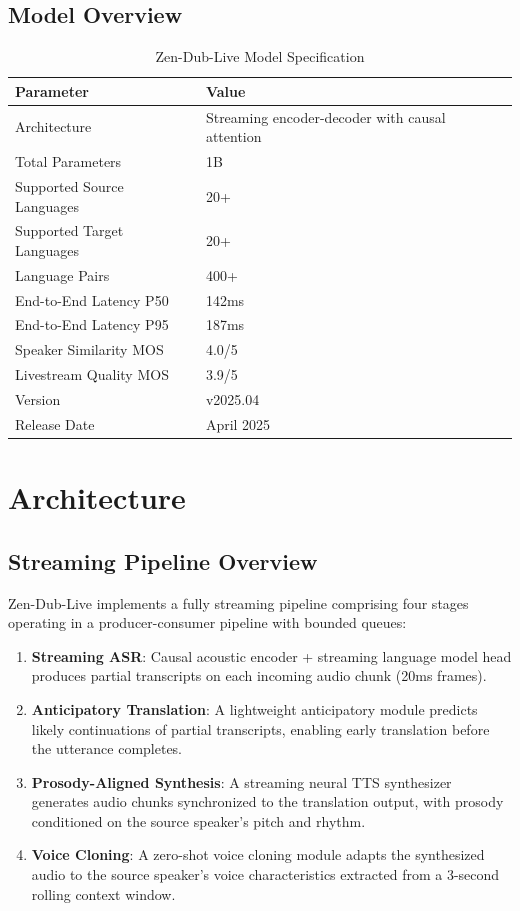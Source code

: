 \documentclass[11pt,a4paper]{article}
\begin{document}
\subsection{Model Overview}

\begin{table}[H]
\centering
\caption{Zen-Dub-Live Model Specification}
\begin{tabular}{ll}
\toprule
\textbf{Parameter} & \textbf{Value} \\
\midrule
Architecture & Streaming encoder-decoder with causal attention \\
Total Parameters & 1B \\
Supported Source Languages & 20+ \\
Supported Target Languages & 20+ \\
Language Pairs & 400+ \\
End-to-End Latency P50 & 142ms \\
End-to-End Latency P95 & 187ms \\
Speaker Similarity MOS & 4.0/5 \\
Livestream Quality MOS & 3.9/5 \\
Version & v2025.04 \\
Release Date & April 2025 \\
\bottomrule
\end{tabular}
\end{table}

\section{Architecture}

\subsection{Streaming Pipeline Overview}

Zen-Dub-Live implements a fully streaming pipeline comprising four stages operating in a producer-consumer pipeline with bounded queues:

\begin{enumerate}
  \item \textbf{Streaming ASR}: Causal acoustic encoder + streaming language model head produces partial transcripts on each incoming audio chunk (20ms frames).
  \item \textbf{Anticipatory Translation}: A lightweight anticipatory module predicts likely continuations of partial transcripts, enabling early translation before the utterance completes.
  \item \textbf{Prosody-Aligned Synthesis}: A streaming neural TTS synthesizer generates audio chunks synchronized to the translation output, with prosody conditioned on the source speaker's pitch and rhythm.
  \item \textbf{Voice Cloning}: A zero-shot voice cloning module adapts the synthesized audio to the source speaker's voice characteristics extracted from a 3-second rolling context window.
\end{enumerate}
\end{document}
